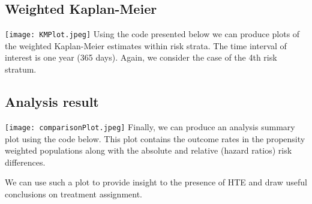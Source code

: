 \documentclass[]{article}
\newenvironment{Shaded}{\begin{snugshade}}{\end{snugshade}}
\newcommand{\DataTypeTok}[1]{\textcolor[rgb]{0.13,0.29,0.53}{#1}}
\newcommand{\DecValTok}[1]{\textcolor[rgb]{0.00,0.00,0.81}{#1}}
\newcommand{\FloatTok}[1]{\textcolor[rgb]{0.00,0.00,0.81}{#1}}
\newcommand{\KeywordTok}[1]{\textcolor[rgb]{0.13,0.29,0.53}{\textbf{#1}}}
\newcommand{\NormalTok}[1]{#1}
\newcommand{\OperatorTok}[1]{\textcolor[rgb]{0.81,0.36,0.00}{\textbf{#1}}}
\newcommand{\OtherTok}[1]{\textcolor[rgb]{0.56,0.35,0.01}{#1}}
\begin{document}
\hypertarget{weighted-kaplan-meier}{%
\subsection{Weighted Kaplan-Meier}\label{weighted-kaplan-meier}}

\texttt{[image: KMPlot.jpeg]} Using the code presented below we can
produce plots of the weighted Kaplan-Meier estimates within risk strata.
The time interval of interest is one year (365 days). Again, we consider
the case of the 4th risk stratum.

\begin{Shaded}
\end{Shaded}

\hypertarget{analysis-result}{%
\subsection{Analysis result}\label{analysis-result}}

\texttt{[image: comparisonPlot.jpeg]} Finally, we can produce an
analysis summary plot using the code below. This plot contains the
outcome rates in the propensity weighted populations along with the
absolute and relative (hazard ratios) risk differences.

\begin{Shaded}
\end{Shaded}

We can use such a plot to provide insight to the presence of HTE and
draw useful conclusions on treatment assignment.
\end{document}

